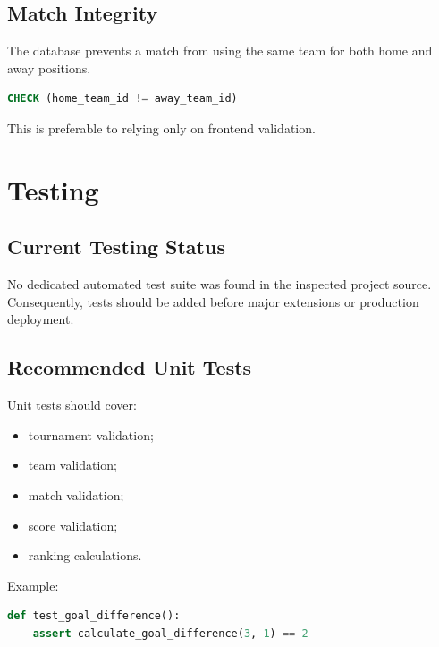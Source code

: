 \documentclass[12pt,a4paper]{article}
\begin{document}
\subsection{Match Integrity}

The database prevents a match from using the same team for both home
and away positions.

\begin{lstlisting}[language=SQL]
CHECK (home_team_id != away_team_id)
\end{lstlisting}

This is preferable to relying only on frontend validation.


\section{Testing}

\subsection{Current Testing Status}

No dedicated automated test suite was found in the inspected project
source. Consequently, tests should be added before major extensions
or production deployment.

\subsection{Recommended Unit Tests}

Unit tests should cover:

\begin{itemize}
    \item tournament validation;
    \item team validation;
    \item match validation;
    \item score validation;
    \item ranking calculations.
\end{itemize}

Example:

\begin{lstlisting}[language=python]
def test_goal_difference():
    assert calculate_goal_difference(3, 1) == 2
\end{lstlisting}
\end{document}
